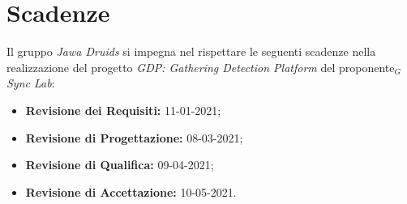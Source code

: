 \section{Scadenze} \label{IntroduzioneScadenze}
Il gruppo \textit{Jawa Druids} si impegna nel rispettare le seguenti scadenze nella realizzazione del progetto \textit{GDP: Gathering Detection Platform} del proponente$_G$ \textit{Sync Lab}:
\begin{itemize}
	\item \textbf{Revisione dei Requisiti:} 11-01-2021;
	\item \textbf{Revisione di Progettazione:} 08-03-2021;
	\item \textbf{Revisione di Qualifica:} 09-04-2021;
	\item \textbf{Revisione di Accettazione:} 10-05-2021.
\end{itemize}

